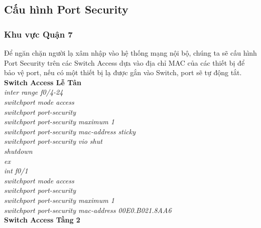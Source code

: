 \documentclass[a4paper, 12pt]{article}
\begin{document}
\subsection{Cấu hình Port Security}
\subsubsection{Khu vực Quận 7}
\hspace*{0.25cm}Để ngăn chặn người lạ xâm nhập vào hệ thống mạng nội bộ, chúng ta sẽ cấu hình Port Security trên các Switch Access dựa vào địa chỉ MAC của các thiết bị để bảo vệ port, nếu có một thiết bị lạ được gắn vào Switch, port sẽ tự động tắt.\\
\hspace*{1cm}\textbf{Switch Access Lễ Tân}\\
\hspace*{2cm}\textit{inter range f0/4-24\\
\hspace*{2cm}switchport mode access\\
\hspace*{2cm}switchport port-security\\
\hspace*{2cm}switchport port-security maximum 1\\
\hspace*{2cm}switchport port-security mac-address sticky\\
\hspace*{2cm}switchport port-security vio shut\\
\hspace*{2cm}shutdown\\
\hspace*{2cm}ex\\
\hspace*{2cm}int f0/1\\
\hspace*{2cm}switchport mode access\\
\hspace*{2cm}switchport port-security\\
\hspace*{2cm}switchport port-security maximum 1\\
\hspace*{2cm}switchport port-security mac-address 00E0.B021.8AA6\\}
\hspace*{1cm}\textbf{Switch Access Tầng 2}\\
\end{document}
